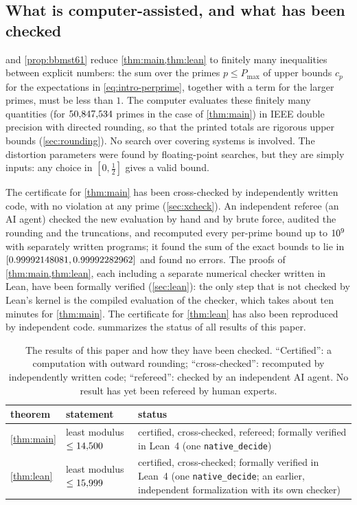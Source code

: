 \subsection{What is computer-assisted, and what has been checked}\label{sec:intro-computer}

 and \cref{prop:bbmst61} reduce \cref{thm:main,thm:lean} to finitely many inequalities between
explicit numbers: the sum over the primes $p\le P_{\max}$ of upper bounds $c_p$ for the expectations in
\eqref{eq:intro-perprime}, together with a term for the larger primes, must be less than $1$. The computer evaluates
these finitely many quantities (for $50{,}847{,}534$ primes in the case of \cref{thm:main}) in IEEE double precision
with directed rounding, so that the printed totals are rigorous upper bounds (\cref{sec:rounding}). No search over
covering systems is involved. The distortion parameters were found by floating-point searches, but they are simply
inputs: any choice in $[0,\tfrac12]$ gives a valid bound.

The certificate for \cref{thm:main} has been cross-checked by independently written code, with no violation at any
prime (\cref{sec:xcheck}). An independent referee (an AI agent) checked the new evaluation by hand and by brute force,
audited the rounding and the truncations, and recomputed every per-prime bound up to $10^{9}$ with separately
written programs; it found the sum of the exact bounds to lie in $[0.99992148081,0.99992282962]$ and found no errors. The
proofs of \cref{thm:main,thm:lean}, each including a separate numerical checker written in Lean, have been formally
verified (\cref{sec:lean}): the only step that is not checked by Lean's kernel is the compiled evaluation of the
checker, which takes about ten minutes for \cref{thm:main}. The certificate for \cref{thm:lean} has also been
reproduced by independent code.  summarizes the status of all results of this paper.

\begin{table}[ht]
\centering
\caption{The results of this paper and how they have been checked. ``Certified'': a computation with outward
rounding; ``cross-checked'': recomputed by independently written code; ``refereed'': checked by an independent AI
agent. No result has yet been refereed by human experts.}
\label{tab:status}
\small
\begin{tabular}{@{}l>{\raggedright\arraybackslash}p{}>{\raggedright\arraybackslash}p{}@{}}
\toprule
theorem & statement & status\\
\midrule
\ref{thm:main} & least modulus $\le14{,}500$ & certified, cross-checked, refereed; formally verified in Lean~4 (one
  \texttt{native\_decide})\\
\ref{thm:lean} & least modulus $\le15{,}999$ & certified, cross-checked; formally verified in Lean~4 (one
  \texttt{native\_decide}; an earlier, independent formalization with its own checker)\\
\bottomrule
\end{tabular}
\end{table}

